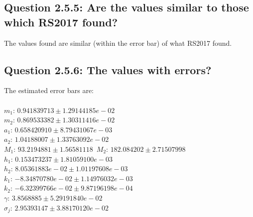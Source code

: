 \documentclass{article}
\begin{document}
\subsection{Question 2.5.5: Are the values similar to those which RS2017 found?}
The values found are similar (within the error bar) of what RS2017 found. 
\subsection{Question 2.5.6: The values with errors?}
The estimated error bars are:\\\\
\noindent
$m_1$:  $ 0.941839713 \pm 1.29144185e-02$\\
$m_2$: $ 0.869533382 \pm 1.30311416e-02$\\
$a_1$: $0.658420910\pm 8.79431067e-03$\\
$a_2$: $1.04188007 \pm 1.33763092e-02$\\
$M_1$: $93.2194881 \pm 1.56581118$\
$M_2$: $182.084202 \pm 2.71507998$\\
$h_1$: $0.153473237 \pm 1.81059100e-03$\\
$h_2$: $8.05361883e-02 \pm 1.01197608e-03$\\
$k_1$: $-8.34870780e-02 \pm 1.14976032e-03$\\
$k_2$: $-6.32399766e-02 \pm 9.87196198e-04$\\
$\gamma$: $3.8568885 \pm 5.29191840e-02$\\
$\sigma_j$: $2.95393147 \pm 3.88170120e-02$
\end{document}
